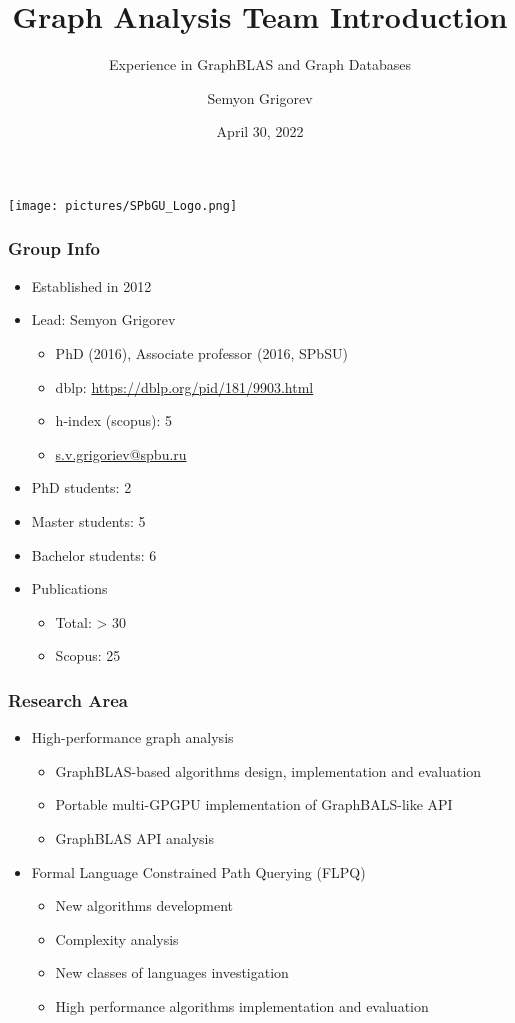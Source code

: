 \documentclass[xcolor=table,aspectratio=169]{beamer}
\title[GraphBLAS \& Graph databases]{Graph Analysis Team Introduction}
\subtitle{Experience in GraphBLAS and Graph Databases}
\institute[PL\&T@SPbSU]{
Saint Petersburg State University
}
\author[Semyon Grigorev]{Semyon Grigorev}
\date{April 30, 2022}
\begin{document}
{
\begin{frame}[fragile]
  \begin{table}
  \centering
  \texttt{[image: pictures/SPbGU\_Logo.png]}  
  \end{table}
  \titlepage
\end{frame}
}

\begin{frame}[fragile]
  \frametitle{Group Info}  
  \begin{itemize}
      \item Established in 2012
      \item Lead: Semyon Grigorev
      \begin{itemize}
        \item PhD (2016), Associate professor (2016, SPbSU)
        \item dblp: \href{https://dblp.org/pid/181/9903.html}{https://dblp.org/pid/181/9903.html}
        \item h-index (scopus): 5
        \item \href{s.v.grigoriev@spbu.ru}{s.v.grigoriev@spbu.ru}
      \end{itemize}
      \item PhD students: 2
      \item Master students: 5
      \item Bachelor students: 6
      \item Publications
      \begin{itemize}
        \item Total: > 30
        \item Scopus: 25 
      \end{itemize}
    \end{itemize}
\end{frame}

\begin{frame}[fragile]
  \frametitle{Research Area}
  \begin{itemize}
    \item High-performance graph analysis
    \begin{itemize}
      \item GraphBLAS-based algorithms design, implementation and evaluation
      \item Portable multi-GPGPU implementation of GraphBALS-like API
      \item GraphBLAS API analysis
    \end{itemize} 
    \pause
    \item Formal Language Constrained Path Querying (FLPQ)
    \begin{itemize}
      \item New algorithms development
      \item Complexity analysis
      \item New classes of languages investigation
      \item High performance algorithms implementation and evaluation 
    \end{itemize}    
  \end{itemize}
\end{frame}
\end{document}
